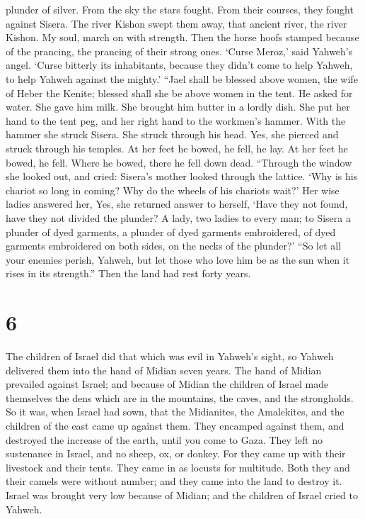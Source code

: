 plunder of silver.  From the sky the stars fought. From
their courses, they fought against Sisera.  The river
Kishon swept them away, that ancient river, the river Kishon. My soul,
march on with strength.  Then the horse hoofs stamped
because of the prancing, the prancing of their strong ones.
 `Curse Meroz,' said Yahweh's angel. `Curse bitterly its
inhabitants, because they didn't come to help Yahweh, to help Yahweh
against the mighty.'  ``Jael shall be blessed above women,
the wife of Heber the Kenite; blessed shall she be above women in the
tent.  He asked for water. She gave him milk. She brought
him butter in a lordly dish.  She put her hand to the tent
peg, and her right hand to the workmen's hammer. With the hammer she
struck Sisera. She struck through his head. Yes, she pierced and struck
through his temples.  At her feet he bowed, he fell, he
lay. At her feet he bowed, he fell. Where he bowed, there he fell down
dead.  ``Through the window she looked out, and cried:
Sisera's mother looked through the lattice. `Why is his chariot so long
in coming? Why do the wheels of his chariots wait?'  Her
wise ladies answered her, Yes, she returned answer to herself,
 `Have they not found, have they not divided the plunder? A
lady, two ladies to every man; to Sisera a plunder of dyed garments, a
plunder of dyed garments embroidered, of dyed garments embroidered on
both sides, on the necks of the plunder?'  ``So let all
your enemies perish, Yahweh, but let those who love him be as the sun
when it rises in its strength.'' Then the land had rest forty years.

\hypertarget{section-5}{%
\section{6}\label{section-5}}

 The children of Israel did that which was evil in Yahweh's
sight, so Yahweh delivered them into the hand of Midian seven years.
 The hand of Midian prevailed against Israel; and because of
Midian the children of Israel made themselves the dens which are in the
mountains, the caves, and the strongholds.  So it was, when
Israel had sown, that the Midianites, the Amalekites, and the children
of the east came up against them.  They encamped against
them, and destroyed the increase of the earth, until you come to Gaza.
They left no sustenance in Israel, and no sheep, ox, or donkey.
 For they came up with their livestock and their tents. They
came in as locusts for multitude. Both they and their camels were
without number; and they came into the land to destroy it. 
Israel was brought very low because of Midian; and the children of
Israel cried to Yahweh.

